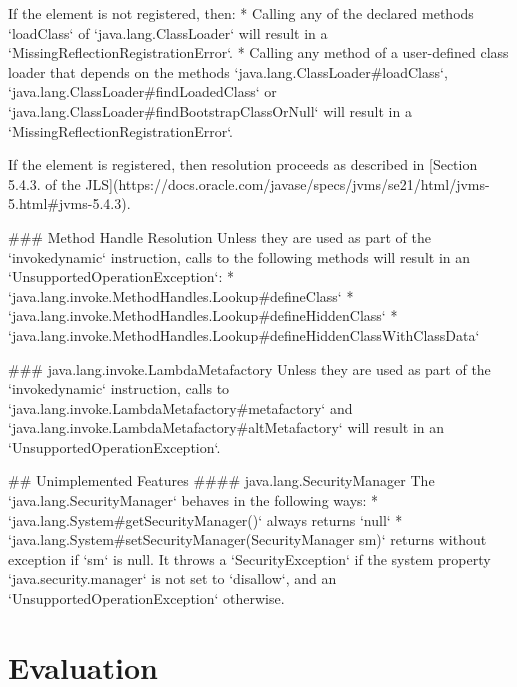 If the element is not registered, then:
* Calling any of the declared methods `loadClass` of `java.lang.ClassLoader` will result in a 
`MissingReflectionRegistrationError`.
* Calling any method of a user-defined class loader that depends on the methods `java.lang.ClassLoader#loadClass`, 
`java.lang.ClassLoader#findLoadedClass` or `java.lang.ClassLoader#findBootstrapClassOrNull` 
will result in a `MissingReflectionRegistrationError`.

If the element is registered, then resolution proceeds as described in 
[Section 5.4.3. of the JLS](https://docs.oracle.com/javase/specs/jvms/se21/html/jvms-5.html#jvms-5.4.3).

### Method Handle Resolution
Unless they are used as part of the `invokedynamic` instruction, calls to the following methods 
will result in an `UnsupportedOperationException`:
* `java.lang.invoke.MethodHandles.Lookup#defineClass`
* `java.lang.invoke.MethodHandles.Lookup#defineHiddenClass`
* `java.lang.invoke.MethodHandles.Lookup#defineHiddenClassWithClassData`

### java.lang.invoke.LambdaMetafactory
Unless they are used as part of the `invokedynamic` instruction, calls to `java.lang.invoke.LambdaMetafactory#metafactory` 
and `java.lang.invoke.LambdaMetafactory#altMetafactory` will result in an `UnsupportedOperationException`.


## Unimplemented Features
#### java.lang.SecurityManager
The `java.lang.SecurityManager` behaves in the following ways:
* `java.lang.System#getSecurityManager()` always returns `null`
* `java.lang.System#setSecurityManager(SecurityManager sm)` returns without exception if `sm` is null. 
It throws a `SecurityException` if the system property `java.security.manager` is not set to `disallow`, and an 
`UnsupportedOperationException` otherwise.



\chapter{Evaluation}


